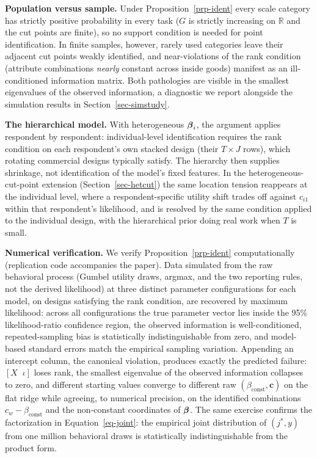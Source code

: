 \documentclass[
  letterpaper,
  DIV=11,
  numbers=noendperiod]{scrartcl}
\theoremstyle{plain}
\theoremstyle{plain}
\theoremstyle{remark}
\begin{document}
\textbf{Population versus sample.} Under Proposition~\ref{prp-ident}
every scale category has strictly positive probability in every task
(\(G\) is strictly increasing on \(\mathbb{R}\) and the cut points are
finite), so no support condition is needed for point identification. In
finite samples, however, rarely used categories leave their adjacent cut
points weakly identified, and near-violations of the rank condition
(attribute combinations \emph{nearly} constant across inside goods)
manifest as an ill-conditioned information matrix. Both pathologies are
visible in the smallest eigenvalues of the observed information, a
diagnostic we report alongside the simulation results in
Section~\ref{sec-simstudy}.

\textbf{The hierarchical model.} With heterogeneous \(\boldsymbol{\beta}_i\), the
argument applies respondent by respondent: individual-level
identification requires the rank condition on each respondent's own
stacked design (their \(T \times J\) rows), which rotating commercial
designs typically satisfy. The hierarchy then supplies shrinkage, not
identification of the model's fixed features. In the
heterogeneous-cut-point extension (Section~\ref{sec-hetcut}) the same
location tension reappears at the individual level, where a
respondent-specific utility shift trades off against \(c_{i1}\) within
that respondent's likelihood, and is resolved by the same condition
applied to the individual design, with the hierarchical prior doing real
work when \(T\) is small.

\textbf{Numerical verification.} We verify Proposition~\ref{prp-ident}
computationally (replication code accompanies the paper). Data simulated
from the raw behavioral process (Gumbel utility draws, argmax, and the
two reporting rules, not the derived likelihood) at three distinct
parameter configurations for each model, on designs satisfying the rank
condition, are recovered by maximum likelihood: across all
configurations the true parameter vector lies inside the 95\%
likelihood-ratio confidence region, the observed information is
well-conditioned, repeated-sampling bias is statistically
indistinguishable from zero, and model-based standard errors match the
empirical sampling variation. Appending an intercept column, the
canonical violation, produces exactly the predicted failure:
\(\left[ X \;\; \iota \right]\) loses rank, the smallest eigenvalue of
the observed information collapses to zero, and different starting
values converge to different raw
\(\left( \beta_{\text{const}}, \mathbf{c} \right)\) on the flat ridge
while agreeing, to numerical precision, on the identified combinations
\(c_w - \beta_{\text{const}}\) and the non-constant coordinates of
\(\boldsymbol{\beta}\). The same exercise confirms the factorization in
Equation~\ref{eq-joint}: the empirical joint distribution of
\(\left( j^*, y \right)\) from one million behavioral draws is
statistically indistinguishable from the product form.
\end{document}
